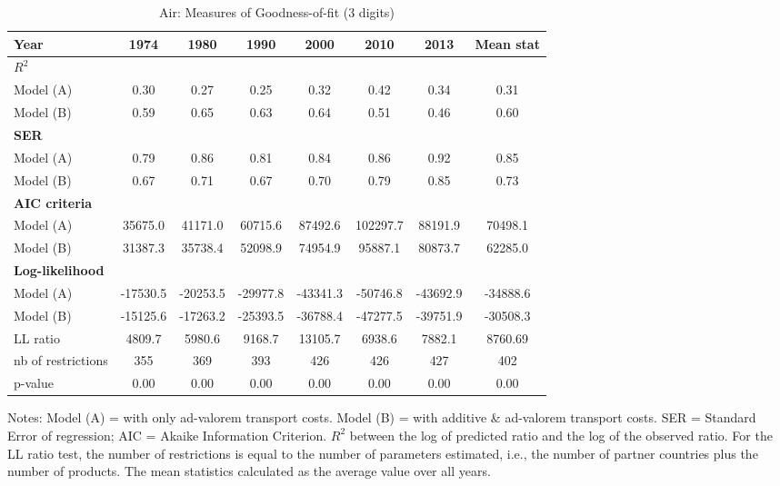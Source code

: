\documentclass[a4paper,11pt]{article}
\begin{document}
\begin{table}[htbp]
  \centering
  \caption{Air: Measures of Goodness-of-fit (3 digits)}
  \footnotesize{
\begin{center}
    \begin{tabular}{l|cccccc|c}
    \hline \hline
    Year  & 1974  & 1980  & 1990  & 2000  & \multicolumn{1}{c}{2010} & \multicolumn{1}{c}{2013} & Mean stat \\ \hline
    \multicolumn{8}{l}{\textbf{$R^2$} }\\ \hline
    Model (A)& 0.30  & 0.27  & 0.25  & 0.32  & \multicolumn{1}{c}{0.42} & \multicolumn{1}{c}{0.34} & 0.31 \\
    Model (B) & 0.59  & 0.65  & 0.63  & 0.64  & \multicolumn{1}{c}{0.51} & \multicolumn{1}{c}{0.46} & 0.60 \\ \hline
    \multicolumn{8}{l}{\textbf{SER}  }  \\ \hline
     Model (A) & 0.79  & 0.86  & 0.81  & 0.84  & \multicolumn{1}{c}{0.86} & \multicolumn{1}{c}{0.92} & 0.85 \\
    Model (B) & 0.67  & 0.71  & 0.67  & 0.70  & \multicolumn{1}{c}{0.79} & \multicolumn{1}{c}{0.85} & 0.73 \\ \hline
   \multicolumn{8}{l}{\textbf{AIC criteria}}  \\ \hline
    Model (A) & 35675.0 & 41171.0 & 60715.6 & 87492.6 & \multicolumn{1}{c}{102297.7} & \multicolumn{1}{c}{88191.9} & 70498.1 \\
    Model (B)  & 31387.3 & 35738.4 & 52098.9 & 74954.9 & \multicolumn{1}{c}{95887.1} & \multicolumn{1}{c}{80873.7} & 62285.0 \\ \hline
    \multicolumn{8}{l}{\textbf{Log-likelihood}} \\ \hline
    Model (A) & -17530.5 & -20253.5 & -29977.8 & -43341.3 & \multicolumn{1}{c}{-50746.8} & \multicolumn{1}{c}{-43692.9} & -34888.6 \\
    Model (B) & -15125.6 & -17263.2 & -25393.5 & -36788.4 & \multicolumn{1}{c}{-47277.5} & \multicolumn{1}{c}{-39751.9} & -30508.3 \\
    LL ratio & 4809.7 & 5980.6 & 9168.7 & 13105.7 & \multicolumn{1}{c}{6938.6} & \multicolumn{1}{c}{7882.1} & 8760.69 \\
    nb of restrictions & 355   & 369   & 393   & 426   & \multicolumn{1}{c}{426} & \multicolumn{1}{c}{427} & 402 \\
    p-value & 0.00 & 0.00 & 0.00 & 0.00 & \multicolumn{1}{c}{0.00} & \multicolumn{1}{c}{0.00} & 0.00 \\
    \hline \hline
 \end{tabular}%
    \end{center}}
  \label{tab:good_fit_air}%
 \parbox[l]{12cm}{\tiny{Notes: Model (A) = with only ad-valorem transport costs.
Model (B) = with additive \& ad-valorem transport costs.
SER = Standard Error of regression; AIC = Akaike Information Criterion.
$R^{2}$ between the log of predicted ratio and the log of the observed ratio.
For the LL ratio test, the number of restrictions is equal to the number of parameters estimated, i.e., the number of partner countries plus the number of products.
The mean statistics calculated as the average value over all years.
}}
\end{table}%
\end{document}
